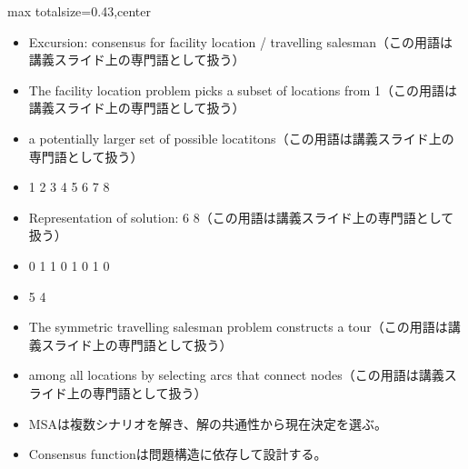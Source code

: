 \clearpage
{}
\begin{minipage}[t]{0.405\textwidth}
\begin{adjustbox}{max totalsize={\textwidth}{0.43\textheight},center}
\begin{minipage}{\textwidth}\scriptsize
{}\begin{itemize}
\item Excursion: consensus for facility location / travelling salesman（この用語は講義スライド上の専門語として扱う）
\item The facility location problem picks a subset of locations from 1（この用語は講義スライド上の専門語として扱う）
\item a potentially larger set of possible locatitons（この用語は講義スライド上の専門語として扱う）
\item 1 2 3 4 5 6 7 8
\item Representation of solution: 6 8（この用語は講義スライド上の専門語として扱う）
\item 0 1 1 0 1 0 1 0
\item 5 4
\item The symmetric travelling salesman problem constructs a tour（この用語は講義スライド上の専門語として扱う）
\item among all locations by selecting arcs that connect nodes（この用語は講義スライド上の専門語として扱う）
\end{itemize}\begin{itemize}
\item MSAは複数シナリオを解き、解の共通性から現在決定を選ぶ。
\item Consensus functionは問題構造に依存して設計する。
\end{itemize}
\end{minipage}
\end{adjustbox}
\end{minipage}\hfill
